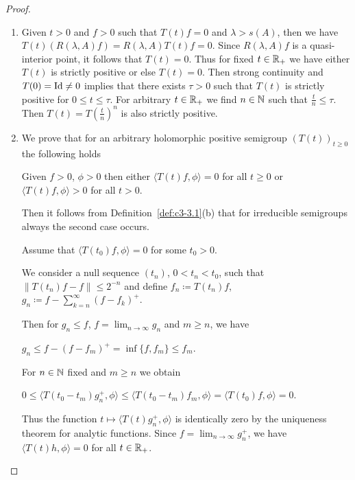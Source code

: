 \begin{proof}
\begin{enumerate}[\upshape (i), wide, labelsep=1em, itemsep=1ex]
	\item
	Given $t > 0$ and $f > 0$ such that $T(t)f = 0$ and $\lambda > s(A)$, then we have $T(t)(R(\lambda,A)f) = R(\lambda,A)T(t)f = 0$.
	Since $R(\lambda,A)f$ is a quasi-interior point, it follows that $T(t) = 0$.
	Thus for fixed $t \in \mathbb{R} _{+}$ we have either $T(t)$ is strictly positive or else $T(t) = 0$.
	Then strong continuity and $T(0) = \operatorname{Id} \neq 0$ implies that there exists $\tau > 0$ such that $T(t)$ is strictly positive for $0 \leq t \leq \tau$.
	For arbitrary $t \in \mathbb{R} _{+}$ we find $n \in \mathbb{N}$ such that $\frac{t}{n} \leq \tau$.
	Then $T(t) = T(\frac{t}{n})^{n}$ is also strictly positive.
	
	\item
	We prove that for an arbitrary holomorphic positive semigroup $(T(t))_{t\geq 0}$ the following holds
	
	Given $f > 0$, $\phi > 0$ then either $\langle T(t)f,\phi \rangle = 0$ for all $t \geq 0$ or $\langle T(t)f,\phi \rangle > 0$ for all $t > 0$.
	
	Then it follows from Definition~\ref{def:c3-3.1}(b) that for irreducible semigroups always the second case occurs.
	
	Assume that $\langle T(t_{0})f,\phi \rangle = 0$ for some $t_{0} > 0$.
	
	We consider a null sequence $(t_{n})$, $0 < t_{n} < t_{0}$, such that $\|T(t_{n})f - f\| \leq 2^{-n}$ and define $f_{n} \coloneqq T(t_{n})f$, $g_{n} \coloneqq f - \sum_{k=n}^{\infty}(f-f_{k})^{+}$.
	
	Then for $g_{n} \leq f$, $f = \lim_{n\to\infty}g_{n}$ and $m \geq n$, 
	we have 
	
	$g_{n} \leq f - (f-f_{m})^{+} = \inf\{f,f_{m}\} \leq f_{m}$.
	
	For $n \in \mathbb{N}$ fixed and $m \geq n$ we obtain 
	
	$0 \leq \langle T(t_{0}-t_{m})g_{n}^{+},\phi \rangle \leq \langle T(t_{0}-t_{m})f_{m},\phi \rangle = \langle T(t_{0})f,\phi \rangle = 0$.
	
	Thus the function $t \mapsto \langle T(t)g_{n}^{+},\phi \rangle$ is identically zero by the uniqueness theorem for analytic functions.
	Since $f = \lim_{n\to\infty}g_{n}^{+}$, we have $\langle T(t)h,\phi \rangle = 0$ for all $t \in \mathbb{R} _{+}$.
\end{enumerate}
\end{proof}


